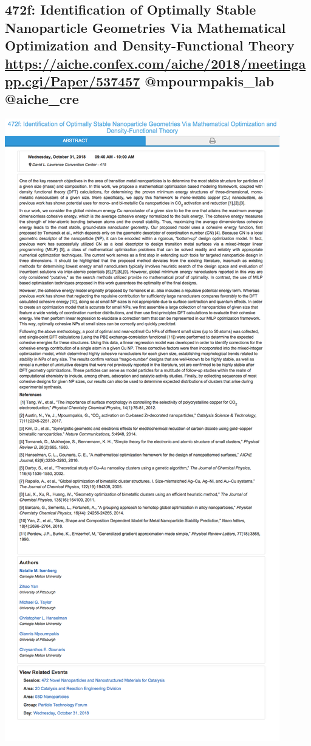 \documentclass[11pt]{article}
\begin{document}
\subsection{472f: Identification of Optimally Stable Nanoparticle Geometries Via Mathematical Optimization and Density-Functional Theory \url{https://aiche.confex.com/aiche/2018/meetingapp.cgi/Paper/537457} @mpourmpakis\_lab @aiche\_cre}
\label{sec:org3784e01}
\begin{center}
\includegraphics[width=.9\linewidth]{./537457.png}
\end{center}
\end{document}

